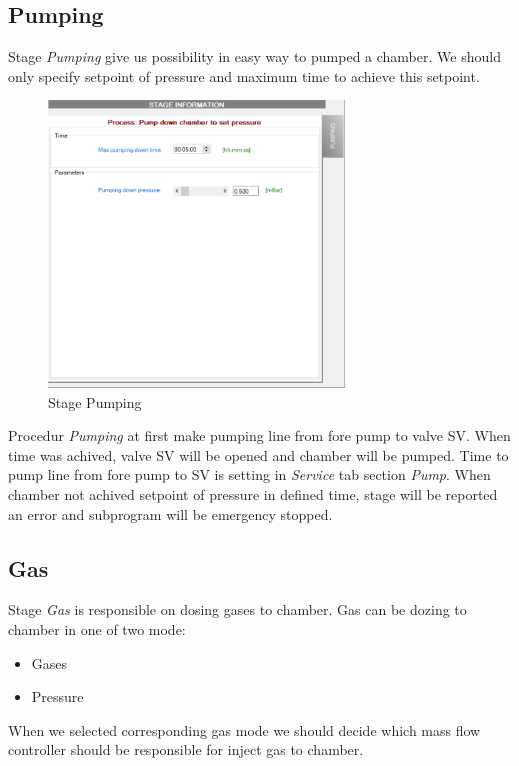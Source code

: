 \subsection{Pumping}

Stage \textit {Pumping} give us possibility in easy way to pumped a chamber. We should only specify setpoint of pressure and maximum time to achieve this setpoint.

	\begin{figure}[!h] 
	\centering \includegraphics[width=0.7\textwidth]{Graphic/Programs/Pumping.png}	
	\caption{Stage Pumping}
	\label{stage_pumping}
	\end{figure}
	\FloatBarrier

Procedur \textit{Pumping} at first make pumping line from fore pump to valve SV. When time was achived, valve SV will be opened and chamber will be pumped. Time to pump line from fore pump to SV is setting in \textit{Service} tab section \textit{Pump}. When chamber not achived setpoint of pressure in defined  time, stage will be reported an error and subprogram will be emergency stopped.


\subsection{Gas}

Stage \textit{Gas} is  responsible on dosing gases to chamber. Gas can be dozing to chamber in one of two mode:

\begin{itemize}
	\item Gases
	\item Pressure
\end{itemize}
When we selected corresponding gas mode we should decide which mass flow controller should be responsible for inject gas to chamber.


